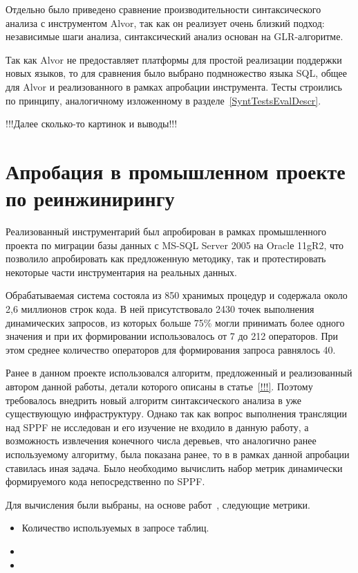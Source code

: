 Отдельно было приведено сравнение производительности синтаксического анализа с инструментом Alvor, так как он реализует очень близкий подход: независимые шаги анализа, синтаксический анализ основан на GLR-алгоритме.

Так как Alvor не предоставляет платформы для простой реализации поддержки новых языков, то для сравнения было выбрано подмножество языка SQL, общее для Alvor и реализованного в рамках апробации инструмента. Тесты строились по принципу, аналогичному изложенному в разделе~\ref{SyntTestsEvalDescr}.

!!!Далее сколько-то картинок и выводы!!!


\section{Апробация в промышленном проекте по реинжинирингу}

Реализованный инструментарий был апробирован в рамках промышленного проекта по миграции базы данных с MS-SQL Server 2005 на Oraclе 11gR2, что позволило апробировать как предложенную методику, так и протестировать некоторые части инструментария на реальных данных.

Обрабатываемая система состояла из 850 хранимых процедур и содержала около 2,6 миллионов строк кода. В ней присутствовало 2430 точек выполнения динамических запросов, из которых больше 75\% могли принимать более одного значения и при их формировании использовалось от 7 до 212 операторов. При этом среднее количество операторов для формирования запроса равнялось 40.

Ранее в данном проекте использовался алгоритм, предложенный и реализованный автором данной работы, детали которого описаны в статье~\ref{!!!}. Поэтому требовалось внедрить новый алгоритм синтаксического анализа в уже существующую инфраструктуру. Однако так как вопрос выполнения трансляции над SPPF не исследован и его изучение не входило в данную работу, а возможность извлечения конечного числа деревьев, что аналогично ранее используемому алгоритму, была показана ранее, то в в рамках данной апробации ставилась иная задача. Было необходимо вычислить набор метрик динамически формируемого кода непосредственно по SPPF. 

Для вычисления были выбраны, на основе работ~\cite{DSQLQualityMesure, DSQLQualityMesureBIG, DevelopmentDSQLTools}, следующие метрики.
\begin{itemize}
    \item Количество используемых в запросе таблиц.
    \item    
    \item 
\end{itemize}


